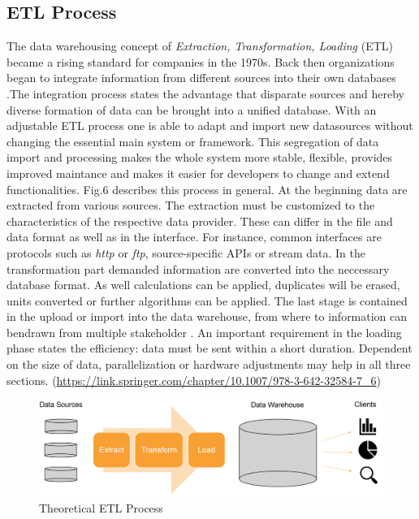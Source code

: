\documentclass[conference, 11pt]{IEEEtran}
\begin{document}
\subsection{ETL Process}
The data warehousing concept of \textit{Extraction, Transformation, Loading} (ETL) became a rising standard for companies in the 1970s. Back then organizations began to integrate information from different sources into their own databases \cite{carl1}.\break The integration process states the advantage that disparate sources and hereby diverse formation of data can be brought into a unified database. With an adjustable ETL process one is able to adapt and import new datasources without 
changing the essential main system or framework. This segregation of data import and processing makes the whole system more stable, flexible, provides improved maintance and makes it easier for developers to change and extend functionalities. Fig.6 describes this process in general. At the beginning data are extracted from various sources. The extraction must be customized to the characteristics of the respective data provider. These can differ in the file and data format as well as in the interface. For instance, common interfaces are protocols such as \textit{http} or \textit{ftp}, source-specific APIs or stream data.
In the transformation part demanded information are converted into the neccessary database format. As well calculations can be applied, duplicates will be erased, units converted or further algorithms can be applied. 
The last stage is contained in the upload or import into the data warehouse, from where to information can bendrawn from multiple stakeholder . An important requirement in the loading phase states the efficiency: data must be sent within a short duration. Dependent on the size of data, parallelization or hardware adjustments may help in all three sections. (\url{https://link.springer.com/chapter/10.1007/978-3-642-32584-7_6})
\linebreak %




\vspace{0.5cm}
\begin{figure}[htbp]
\centerline{\includegraphics[scale=0.3]{Graphics/ETLTheory.PNG}}
\caption{Theoretical ETL Process}
\label{fig}
\end{figure}
\vspace{0.5cm}
\end{document}
